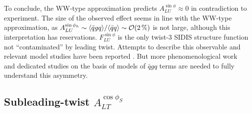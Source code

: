 \documentclass[a4paper,11pt]{article}
\newcommand{\la}{\langle}
\newcommand{\ra}{\rangle}
\begin{document}
To conclude, the WW-type approximation predicts $A_{LU}^{\sin\phi}\approx 0$
in contradiction to experiment. The size of the observed effect seems
in line with the WW-type approximation, as
$A_{LU}^{\sin\phi_h}\sim\la\bar{q}gq\ra/\la\bar{q}q\ra \sim {\cal O}(2\,\%)$
is not large, although this interpretation has reservations.
$F_{LU}^{\sin\phi}$ is the only twist-3 SIDIS structure function not
``contaminated'' by leading twist. Attempts to describe this observable
and relevant model studies have been reported
\cite{Efremov:2002qh,Schweitzer:2003uy,Ohnishi:2003mf,Cebulla:2007ej,
Efremov:2002ut,Afanasev:2003ze,Yuan:2003gu,Gamberg:2003pz,Metz:2004je,Afanasev:2006gw,Mao:2012dk,Mao:2013waa,Mao:2014dva,Lorce:2014hxa,Courtoy:2014ixa,Yang:2016mxl, Pasquini:2018oyz}.
But more phenomenological work and dedicated studies on the basis of models
of $\bar{q}gq$ terms are needed to fully understand this asymmetry.


\subsection{\boldmath Subleading-twist  $A_{LT}^{\cos\phi_S}$}
\label{Sec-7.2:FLTcosphiS}
\end{document}
